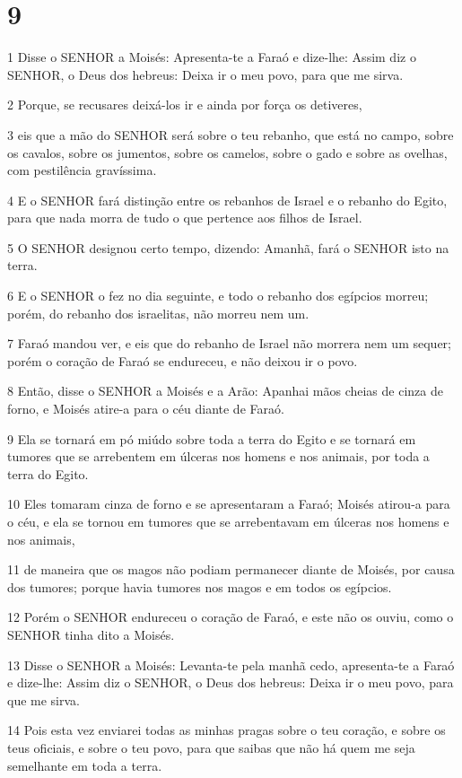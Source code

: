 \chapter{9}

\par 1 Disse o SENHOR a Moisés: Apresenta-te a Faraó e dize-lhe: Assim diz o SENHOR, o Deus dos hebreus: Deixa ir o meu povo, para que me sirva.
\par 2 Porque, se recusares deixá-los ir e ainda por força os detiveres,
\par 3 eis que a mão do SENHOR será sobre o teu rebanho, que está no campo, sobre os cavalos, sobre os jumentos, sobre os camelos, sobre o gado e sobre as ovelhas, com pestilência gravíssima.
\par 4 E o SENHOR fará distinção entre os rebanhos de Israel e o rebanho do Egito, para que nada morra de tudo o que pertence aos filhos de Israel.
\par 5 O SENHOR designou certo tempo, dizendo: Amanhã, fará o SENHOR isto na terra.
\par 6 E o SENHOR o fez no dia seguinte, e todo o rebanho dos egípcios morreu; porém, do rebanho dos israelitas, não morreu nem um.
\par 7 Faraó mandou ver, e eis que do rebanho de Israel não morrera nem um sequer; porém o coração de Faraó se endureceu, e não deixou ir o povo.
\par 8 Então, disse o SENHOR a Moisés e a Arão: Apanhai mãos cheias de cinza de forno, e Moisés atire-a para o céu diante de Faraó.
\par 9 Ela se tornará em pó miúdo sobre toda a terra do Egito e se tornará em tumores que se arrebentem em úlceras nos homens e nos animais, por toda a terra do Egito.
\par 10 Eles tomaram cinza de forno e se apresentaram a Faraó; Moisés atirou-a para o céu, e ela se tornou em tumores que se arrebentavam em úlceras nos homens e nos animais,
\par 11 de maneira que os magos não podiam permanecer diante de Moisés, por causa dos tumores; porque havia tumores nos magos e em todos os egípcios.
\par 12 Porém o SENHOR endureceu o coração de Faraó, e este não os ouviu, como o SENHOR tinha dito a Moisés.
\par 13 Disse o SENHOR a Moisés: Levanta-te pela manhã cedo, apresenta-te a Faraó e dize-lhe: Assim diz o SENHOR, o Deus dos hebreus: Deixa ir o meu povo, para que me sirva.
\par 14 Pois esta vez enviarei todas as minhas pragas sobre o teu coração, e sobre os teus oficiais, e sobre o teu povo, para que saibas que não há quem me seja semelhante em toda a terra.
